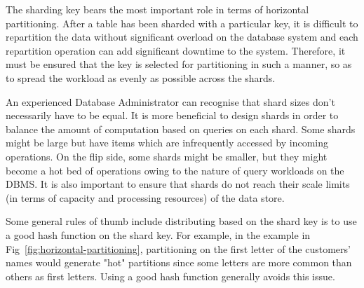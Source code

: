 The sharding key bears the most important role in terms of horizontal partitioning. After a table has been sharded with a particular key, it is difficult to repartition the data without significant overload on the database system and each repartition operation can add significant downtime to the system. Therefore, it must be ensured that the key is selected for partitioning in such a manner, so as to spread the workload as evenly as possible across the shards.

An experienced Database Administrator can recognise that shard sizes don't necessarily have to be equal. It is more beneficial to design shards in order to balance the amount of computation based on queries on each shard. Some shards might be large but have items which are infrequently accessed by incoming operations. On the flip side, some shards might be smaller, but they might become a hot bed of operations owing to the nature of query workloads on the DBMS. It is also important to ensure that shards do not reach their scale limits (in terms of capacity and processing resources) of the data store.

Some general rules of thumb include distributing based on the shard key is to use a good hash function on the shard key. For example, in the example in Fig~\ref{fig:horizontal-partitioning}, partitioning on the first letter of the customers' names would generate "hot" partitions since some letters are more common than others as first letters. Using a good hash function generally avoids this issue.

